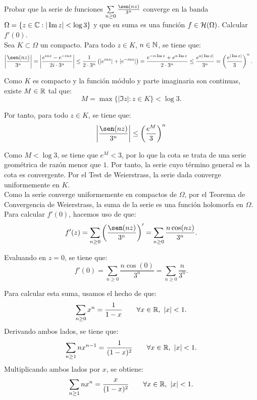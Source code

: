 \begin{ejercicio}
    Probar que la serie de funciones $\sum\limits_{n\geq 0} \frac{\sen(nz)}{3^n}$ converge en la banda $\Omega = \{z\in\mathbb{C} : |\operatorname{Im} z| < \log 3\}$ y que su suma es una función $f\in \mathcal{H}(\Omega)$. Calcular $f'(0)$.\\

    Sea $K\subset \Omega$ un compacto. Para todo $z\in K$, $n\in\mathbb{N}$, se tiene que:
    \begin{align*}
        \left|\dfrac{\sen(nz)}{3^n}\right| &= \left|\dfrac{e^{inz} - e^{-inz}}{2i\cdot 3^n}\right|\leq \dfrac{1}{2\cdot 3^n} \left(|e^{inz}| + |e^{-inz}|\right)
        = \dfrac{e^{-n\Im z} + e^{n\Im z}}{2\cdot 3^n}
        \leq \dfrac{e^{n|\Im z|}}{3^n}
        = \left(\dfrac{e^{|\Im z|}}{3}\right)^n.
    \end{align*}

    Como $K$ es compacto y la función módulo y parte imaginaria son continuas, existe $M\in\mathbb{R}$ tal que:
    \[
    M = \max\{|\Im z| : z\in K\} < \log 3.
    \]

    Por tanto, para todo $z\in K$, se tiene que:
    \[
    \left|\dfrac{\sen(nz)}{3^n}\right| \leq \left(\dfrac{e^M}{3}\right)^n
    \]

    Como $M<\log 3$, se tiene que $e^M < 3$, por lo que la cota se trata de una serie geométrica de razón menor que $1$. Por tanto, la serie cuyo término general es la cota es convergente. Por el Test de Weierstrass, la serie dada converge uniformemente en $K$.\\

    Como la serie converge uniformemente en compactos de $\Omega$, por el Teorema de Convergencia de Weierstrass, la suma de la serie es una función holomorfa en $\Omega$.\\

    Para calcular $f'(0)$, hacemos uso de que:
    \begin{equation*}
        f'(z) = \sum_{n\geq 0} \left(\dfrac{\sen(nz)}{3^n}\right)' = \sum_{n\geq 0} \dfrac{n\cos(nz)}{3^n}.
    \end{equation*}

    Evaluando en $z=0$, se tiene que:
    \begin{equation*}
        f'(0) = \sum_{n\geq 0} \dfrac{n\cos(0)}{3^n} = \sum_{n\geq 0} \dfrac{n}{3^n}.
    \end{equation*}

    Para calcular esta suma, usamos el hecho de que:
    \begin{equation*}
        \sum_{n\geq 0} x^n = \dfrac{1}{1-x}\qquad \forall x\in\mathbb{R},\ |x|<1.
    \end{equation*}
    Derivando ambos lados, se tiene que:
    \begin{equation*}
        \sum_{n\geq 1} n x^{n-1} = \dfrac{1}{(1-x)^2}\qquad \forall x\in\mathbb{R},\ |x|<1.
    \end{equation*}
    Multiplicando ambos lados por $x$, se obtiene:
    \begin{equation*}
        \sum_{n\geq 1} n x^n = \dfrac{x}{(1-x)^2}\qquad \forall x\in\mathbb{R},\ |x|<1.
    \end{equation*}


\end{ejercicio}
